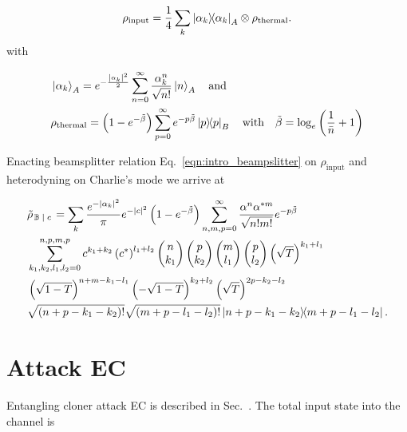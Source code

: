 \begin{equation}\label{eqn:qds_bs1_input_state}
\rho_{\text{input}} = \frac{1}{4}\sum_k \dyad{\alpha_k}_A \otimes \rho_{\text{thermal}}.
\end{equation}
with 

\begin{align}
&\ket{\alpha_k}_A = e^{- \frac{\left| \alpha_k \right|^2}{2}} \sum_{n=0}^\infty \frac{\alpha_k^n}{\sqrt{n!}} \ket{n}_A \qq{and}\notag \\
&\rho_{\text{thermal}} = \left(1 - e^{-\tilde{\beta}}\right) \sum_{p=0}^\infty e^{- p \tilde{\beta}}\dyad{p}_B \qq{with} \tilde{\beta} = \log_e\left(\frac{1}{\bar{n}} +1\right)
\end{align}



\noindent Enacting beamsplitter relation Eq.~\ref{eqn:intro_beampslitter} on $\rho_{\text{input}}$ and heterodyning on Charlie's mode we arrive at 

\begin{align}\label{eqn:appendix_bs1_state}
%
&\tilde{\rho}_{\left. \mathbb{B} \given c\right.} = \sum_k \frac{e^{- \left|\alpha_k\right|^2}}{\pi} e^{-\left|c\right|^2} \left( 1 - e^{- \tilde{\beta}}\right) \sum_{n, m, p = 0}^\infty \frac{\alpha^n \alpha^{* m}}{\sqrt{n! m!}} e^{- p \tilde{\beta}}  \notag \\
%
&\sum_{k_1, k_2, l_1, l_2=0}^{n, p, m, p} c^{k_1 + k_2} \left(c^*\right)^{l_1 + l_2} \pmqty{n \\ k_1} \pmqty{ p \\ k_2} \pmqty{ m \\ l_1 } \pmqty{p \\ l_2} \left( \sqrt{T} \right)^{k_1 + l_1} \notag \\
%
&\left(\sqrt{1-T}\right)^{n + m - k_1 - l_1} \left( - \sqrt{1-T}\right)^{k_2 + l_2} \left( \sqrt{T} \right)^{2 p - k_2 - l_2} \notag \\
%
&\sqrt{\left(n + p - k_1 - k_2\right)!}\sqrt{\left(m + p - l_1 - l_2 \right)!} \dyad{n + p - k_1 - k_2}{m + p - l_1 - l_2}.
%
\end{align}

\section{Attack EC}\label{appendix:ec_state}
Entangling cloner attack EC is described in Sec.~. The total input state into the channel is

